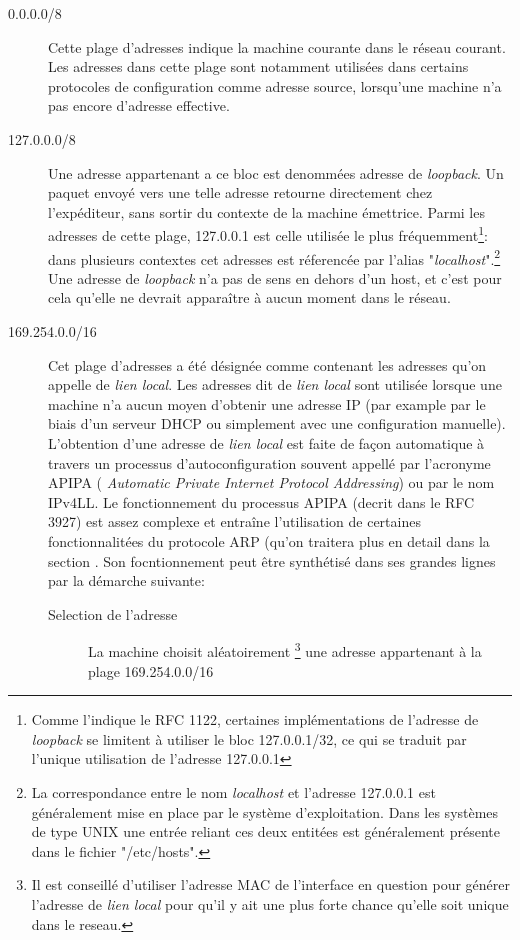 \begin{description}
\item[0.0.0.0/8]
Cette plage d'adresses indique la machine courante dans le réseau courant.
Les adresses dans cette plage sont notamment utilisées dans certains protocoles de
configuration comme adresse source, lorsqu'une machine n'a pas encore d'adresse effective.

\item[127.0.0.0/8]
Une adresse appartenant a ce bloc est denommées adresse de {\it loopback}.  Un
paquet envoyé vers une telle adresse retourne directement chez l'expéditeur, sans sortir
du contexte de la machine émettrice. Parmi les adresses de cette plage,
127.0.0.1 est celle utilisée le plus fréquemment\footnote{Comme l'indique
le RFC 1122, certaines implémentations de l'adresse de {\it loopback} se
limitent à utiliser le bloc 127.0.0.1/32, ce qui se traduit par l'unique utilisation de
l'adresse 127.0.0.1 }: dans plusieurs contextes cet adresses est réferencée par
l'alias "{\it localhost}".\footnote{La correspondance entre le nom {\it localhost} et
l'adresse 127.0.0.1 est généralement mise en place par le système d'exploitation.
Dans les systèmes de type UNIX une entrée reliant ces deux entitées est généralement
présente dans le fichier "/etc/hosts".}
Une adresse de {\it loopback} n'a pas de sens en dehors
d'un host, et c'est pour cela qu'elle ne devrait apparaître à aucun moment dans le réseau.


\item[169.254.0.0/16]
Cet plage d'adresses a été désignée comme contenant les adresses qu'on appelle
de {\it lien local}.  Les adresses dit de {\it lien local} sont utilisée lorsque
une machine n'a aucun moyen d'obtenir une adresse IP (par example par le biais
d'un serveur DHCP ou simplement avec une configuration manuelle).  L'obtention
d'une adresse de {\it lien local} est faite de façon automatique à travers un
processus d'autoconfiguration souvent appellé par l'acronyme APIPA ({\it
Automatic Private Internet Protocol Addressing}) ou par le nom IPv4LL.  Le
fonctionnement du processus APIPA (decrit dans le RFC 3927) est assez complexe
 et entraîne l'utilisation de certaines fonctionnalitées du
protocole ARP (qu'on traitera plus en detail dans la section %
. Son focntionnement peut être synthétisé dans ses grandes lignes par la démarche suivante:

\begin{description}
\item[Selection de l'adresse]
La machine choisit aléatoirement
    \footnote{Il est conseillé d'utiliser l'adresse MAC de l'interface en question
    pour générer l'adresse de {\it lien local} pour qu'il y ait une plus forte chance
    qu'elle soit unique dans le reseau.} 
une adresse appartenant à la plage 169.254.0.0/16


\end{description}
\end{description}
